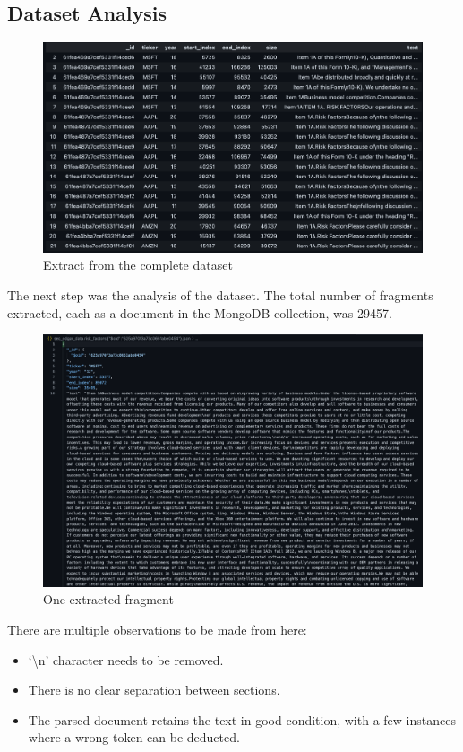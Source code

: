 \documentclass[12pt,MSc,a4paper,oneside]{muthesis}
\begin{document}
\clearpage

\subsection{Dataset Analysis}

\begin{figure}[h]
  \centering
  \includegraphics[scale=0.4]{dataset_analysis/extract_dataset.png}
  \caption{Extract from the complete dataset}
\end{figure}

The next step was the analysis of the dataset. The total number of fragments extracted, each as a document in the MongoDB collection, was 29457.

\begin{figure}[h]
  \centering
  \includegraphics[scale=0.2]{dataset_analysis/example_fragment.png}
  \caption{One extracted fragment}
\end{figure}

There are multiple observations to be made from here:
\begin{itemize}
  \item ‘\textbackslash n’ character needs to be removed.
  \item There is no clear separation between sections.
  \item The parsed document retains the text in good condition, with a few instances where a wrong token can be deducted.
\end{itemize}
\end{document}
